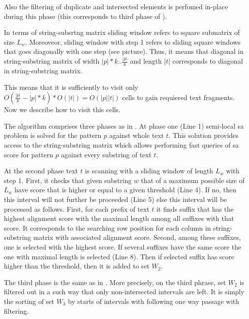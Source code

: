 Also the filtering of duplicate and intersected elements is perfomed in-place during this phase (this corresponds to third phase of \cite{luciv2019interactive}).

In terms of string-subsrtng matrix sliding window refers to square submatrix of size $L_{w}$.
Moreoveor, sliding window with step 1 refers to sliding square windows that goes diagonally with one step (see picture).
Thus, it means that diagonal in string-substring matrix of width $|p|*k..\frac{|p|}{k}$ and length $|t|$ corresponds to diagonal in string-substring matrix.




This means that it is sufficiently to visit only $O(\frac{|p|}{k} - |p|*k) * O(|t|) = O(|p||t|)$  cells to gain requiered text fragments.
Now we describe how to visit this cells.





The algorithm comprises three phases as in \cite{luciv2019interactive}.
At phase one (Line 1) semi-local sa problem is solved for the pattern $p$ against whole text $t$.
This solution provides access to the string-substring matrix which allows performing fast queries of sa score for pattern $p$ against every substring of text $t$.

At the second phase text $t$ is scanning with a sliding window of length $L_{w}$ with step 1.
First, it checks that given substring $w$ that of a maximum possible size of $L_{w}$ have score that is higher or equal to a given threshold (Line 4).
If no, then this interval will not further be proceeded (Line 5) else this interval will be processed as follows.
First, for each prefix of text $t$ it finds suffix that has the highest alignment score with the maximal length among all suffixes with that score. 
It corresponds to the searching row position for each column in string-substring matrix with associated alignment score. 
Second, among these suffixes, one is selected with the highest score.
If several suffixes have the same score the one with maximal length is selected (Line 8).
Then if selected suffix has score higher than the threshold, then it is added to set $W_2$.

The third phase is the same as in \cite{luciv2019interactive}. 
More precisely, on the third phrase, set $W_{2}$ is filtered out in a such way that only non-intersected intervals are left.
It is simply the sorting of set $W_{3}$ by starts of intervals with following one way passage with filtering.  


